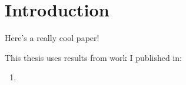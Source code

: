 \chapter{Introduction}
\label{ch:intro}


Here's a really cool paper!~\cite{strowes:2011:reallycool}

This thesis uses results from work I published in:
\begin{enumerate}
        \item {} %
\end{enumerate}




